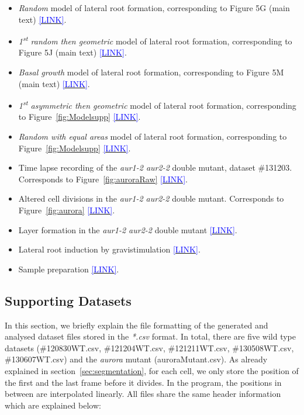 \documentclass[11pt,a4paper, final]{article}
\newenvironment{Itemize}{
 \begin{itemize}[leftmargin=0.5cm]{
}}{\end{itemize}}
\begin{document}
\begin{Itemize}
  \item \emph{Random} model of lateral root formation, corresponding to Figure 5G (main text) \href{https://youtu.be/So1GQrtu41w}{\textcolor{blue}{[LINK]}}.
  \item \emph{1\textsuperscript{st} random then geometric} model of lateral root formation, corresponding to Figure 5J (main text)
  \href{https://youtu.be/H6RUvnqBTVA}{\textcolor{blue}{[LINK]}}.
  \item \emph{Basal growth} model of lateral root formation, corresponding to Figure 5M (main text) \href{https://youtu.be/TZqwYTnmAgg}{\textcolor{blue}{[LINK]}}.
  \item \emph{1\textsuperscript{st} asymmetric then geometric} model of lateral root formation, corresponding to Figure~\ref{fig:Modelsupp} \href{https://youtu.be/ypBdyjFyqYw}{\textcolor{blue}{[LINK]}}.
  \item \emph{Random with equal areas} model of lateral root formation, corresponding to Figure~\ref{fig:Modelsupp}
  \href{https://youtu.be/gB-Qt0_H1ok}{\textcolor{blue}{[LINK]}}.
  \item Time lapse recording of the \emph{aur1-2 aur2-2} double mutant, dataset \#131203. Corresponds to Figure~\ref{fig:auroraRaw} \href{http://youtu.be/y8b-0J4lPHg}{\textcolor{blue}{[LINK]}}.
  \item Altered cell divisions in the \emph{aur1-2 aur2-2} double mutant. Corresponds to Figure~\ref{fig:aurora} \href{http://youtu.be/kkQZub-puVI}{\textcolor{blue}{[LINK]}}.
  \item Layer formation in the \emph{aur1-2 aur2-2} double mutant \href{http://youtu.be/FH5BJ177TGk}{\textcolor{blue}{[LINK]}}.
  \item Lateral root induction by gravistimulation \href{http://youtu.be/sLvVCbWye-E}{\textcolor{blue}{[LINK]}}.
  \item Sample preparation \href{https://youtu.be/uFdOIjmO9vI}{\textcolor{blue}{[LINK]}}.
\end{Itemize}

\clearpage
\subsection{Supporting Datasets}
\label{sec:datasets}
\noindent
In this section, we briefly explain the file formatting of the generated and analysed dataset files stored in the \textit{*.csv} format. In total, there are five wild type datasets (\#120830WT.csv, \#121204WT.csv, \#121211WT.csv, \#130508WT.csv, \#130607WT.csv) and the \emph{aurora} mutant (auroraMutant.csv). As already explained in section~\ref{sec:segmentation}, for each cell, we only store the position of the first and the last frame before it divides. In the program, the positions in between are interpolated linearly. All files share the same header information which are explained below:
\end{document}
